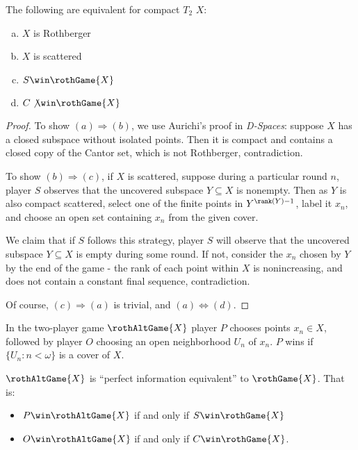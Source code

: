   \begin{thm}
    The following are equivalent for compact $T_2$ $X$:
      \begin{enumerate}[(a)]
        \item $X$ is Rothberger
        \item $X$ is scattered
        \item $S\win\rothGame{X}$
        \item $C\not\win\rothGame{X}$
      \end{enumerate}
  \end{thm}

  \begin{proof}
    To show $(a)\Rightarrow(b)$, we use Aurichi's proof in \textit{D-Spaces}: suppose $X$ has a closed subspace without isolated points. Then it is compact and contains a closed copy of the Cantor set, which is not Rothberger, contradiction.

    To show $(b)\Rightarrow(c)$, if $X$ is scattered, suppose during a particular round $n$, player $S$ observes that the uncovered subspace $Y \subseteq X$ is nonempty. Then as $Y$ is also compact scattered,  select one of the finite points in $Y^{\rank(Y)-1}$, label it $x_n$, and choose an open set containing $x_n$ from the given cover.

    We claim that if $S$ follows this strategy, player $S$ will observe that the uncovered subspace $Y\subseteq X$ is empty during some round. If not, consider the $x_n$ chosen by $Y$ by the end of the game - the rank of each point within $X$ is nonincreasing, and does not contain a constant final sequence, contradiction.

    Of course, $(c)\Rightarrow(a)$ is trivial, and $(a)\Leftrightarrow(d)$.
  \end{proof}

  \begin{defn}
    In the two-player game $\rothAltGame{X}$ player $P$ chooses points $x_n\in X$, followed by player $O$ choosing an open neighborhood $U_n$ of $x_n$. $P$ wins if $\{U_n:n<\omega\}$ is a cover of $X$.
  \end{defn}

  \begin{thm} $\rothAltGame{X}$ is ``perfect information equivalent'' to $\rothGame{X}$. That is:

    \begin{itemize}
      \item $P\win\rothAltGame{X}$ if and only if $S\win\rothGame{X}$
      \item $O\win\rothAltGame{X}$ if and only if $C\win\rothGame{X}$.
    \end{itemize}
  \end{thm}

